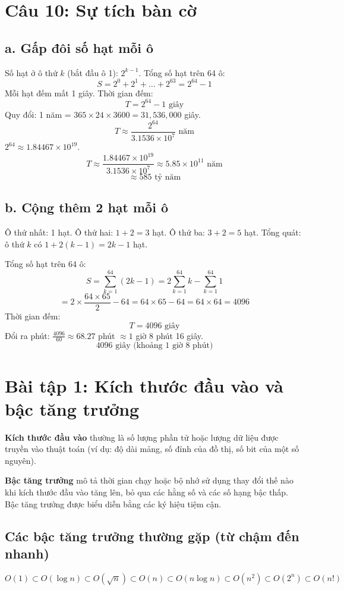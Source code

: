 \documentclass[12pt,a4paper]{article}
\begin{document}
\section*{Câu 10: Sự tích bàn cờ}

\subsection*{a. Gấp đôi số hạt mỗi ô}
Số hạt ở ô thứ $k$ (bắt đầu ô 1): $2^{k-1}$.  
Tổng số hạt trên 64 ô:
\[
S = 2^0 + 2^1 + \dots + 2^{63} = 2^{64} - 1
\]
Mỗi hạt đếm mất 1 giây.  
Thời gian đếm:
\[
T = 2^{64} - 1 \text{ giây}
\]
Quy đổi:  
1 năm = $365 \times 24 \times 3600 = 31,536,000$ giây.  
\[
T \approx \frac{2^{64}}{3.1536 \times 10^7} \text{ năm}
\]
$2^{64} \approx 1.84467 \times 10^{19}$.  
\[
T \approx \frac{1.84467 \times 10^{19}}{3.1536 \times 10^7} \approx 5.85 \times 10^{11} \text{ năm}
\]
\[
\boxed{\approx 585 \text{ tỷ năm}}
\]

\subsection*{b. Cộng thêm 2 hạt mỗi ô}
Ô thứ nhất: 1 hạt.  
Ô thứ hai: $1+2 = 3$ hạt.  
Ô thứ ba: $3+2 = 5$ hạt.  
Tổng quát: ô thứ $k$ có $1 + 2(k-1) = 2k-1$ hạt.  

Tổng số hạt trên 64 ô:
\[
S = \sum_{k=1}^{64} (2k-1) = 2\sum_{k=1}^{64} k - \sum_{k=1}^{64} 1
\]
\[
= 2 \times \frac{64 \times 65}{2} - 64 = 64 \times 65 - 64 = 64 \times 64 = 4096
\]
Thời gian đếm:
\[
T = 4096 \text{ giây}
\]
Đổi ra phút: $\frac{4096}{60} \approx 68.27$ phút $\approx 1$ giờ 8 phút 16 giây.  
\[
\boxed{4096 \text{ giây (khoảng 1 giờ 8 phút)}}
\]



\section*{Bài tập 1: Kích thước đầu vào và bậc tăng trưởng}

\textbf{Kích thước đầu vào} thường là số lượng phần tử hoặc lượng dữ liệu được truyền vào thuật toán (ví dụ: độ dài mảng, số đỉnh của đồ thị, số bit của một số nguyên).

\textbf{Bậc tăng trưởng} mô tả thời gian chạy hoặc bộ nhớ sử dụng thay đổi thế nào khi kích thước đầu vào tăng lên, bỏ qua các hằng số và các số hạng bậc thấp. Bậc tăng trưởng được biểu diễn bằng các ký hiệu tiệm cận.

\subsection*{Các bậc tăng trưởng thường gặp (từ chậm đến nhanh)}
\[
O(1) \subset O(\log n) \subset O(\sqrt{n}) \subset O(n) \subset O(n\log n) \subset O(n^2) \subset O(2^n) \subset O(n!)
\]
\end{document}
